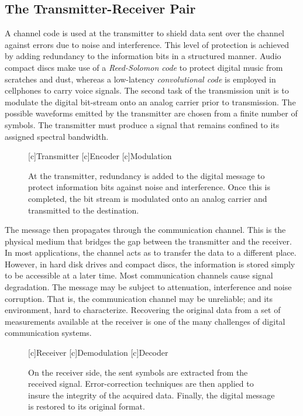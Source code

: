 \subsection{The Transmitter-Receiver Pair}

A channel code is used at the transmitter to shield data sent over the channel against errors due to noise and interference.
This level of protection is achieved by adding redundancy to the information bits in a structured manner.
Audio compact discs make use of a \emph{Reed-Solomon code} to protect digital music from scratches and dust, whereas a low-latency \emph{convolutional code} is employed in cellphones to carry voice signals.
The second task of the transmission unit is to modulate the digital bit-stream onto an analog carrier prior to transmission.
The possible waveforms emitted by the transmitter are chosen from a finite number of symbols.
The transmitter must produce a signal that remains confined to its assigned spectral bandwidth.

\begin{figure}[htbp]
\begin{center}
\begin{psfrags}
[c]{Transmitter}
[c]{Encoder}
[c]{Modulation}
\end{psfrags}
\end{center}
\caption{At the transmitter, redundancy is added to the digital message to protect information bits against noise and interference.
Once this is completed, the bit stream is modulated onto an analog carrier and transmitted to the destination.}
\label{figure:BlockTransmitter}
\end{figure}

The message then propagates through the communication channel.
This is the physical medium that bridges the gap between the transmitter and the receiver.
In most applications, the channel acts as to transfer the data to a different place.
However, in hard disk drives and compact discs, the information is stored simply to be accessible at a later time.
Most communication channels cause signal degradation.
The message may be subject to attenuation, interference and noise corruption.
That is, the communication channel may be unreliable; and its environment, hard to characterize.
Recovering the original data from a set of measurements available at the receiver is one of the many challenges of digital communication systems.

\begin{figure}[htbp]
\begin{center}
\begin{psfrags}
[c]{Receiver}
[c]{Demodulation}
[c]{Decoder}
\end{psfrags}
\end{center}
\caption{On the receiver side, the sent symbols are extracted from the received signal.
Error-correction techniques are then applied to insure the integrity of the acquired data.
Finally, the digital message is restored to its original format.}
\label{figure:BlockReceiver}
\end{figure}

